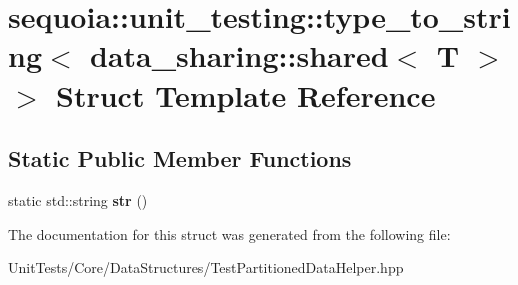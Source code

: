 \hypertarget{structsequoia_1_1unit__testing_1_1type__to__string_3_01data__sharing_1_1shared_3_01_t_01_4_01_4}{}\section{sequoia\+::unit\+\_\+testing\+::type\+\_\+to\+\_\+string$<$ data\+\_\+sharing\+::shared$<$ T $>$ $>$ Struct Template Reference}
\label{structsequoia_1_1unit__testing_1_1type__to__string_3_01data__sharing_1_1shared_3_01_t_01_4_01_4}
\subsection*{Static Public Member Functions}
\begin{DoxyCompactItemize}
\item 
\mbox{\label{structsequoia_1_1unit__testing_1_1type__to__string_3_01data__sharing_1_1shared_3_01_t_01_4_01_4_a3b932cdfc236ff2f0b7f3e45a269703e}} 
static std\+::string {\bfseries str} ()
\end{DoxyCompactItemize}


The documentation for this struct was generated from the following file\+:\begin{DoxyCompactItemize}
\item 
Unit\+Tests/\+Core/\+Data\+Structures/Test\+Partitioned\+Data\+Helper.\+hpp\end{DoxyCompactItemize}
